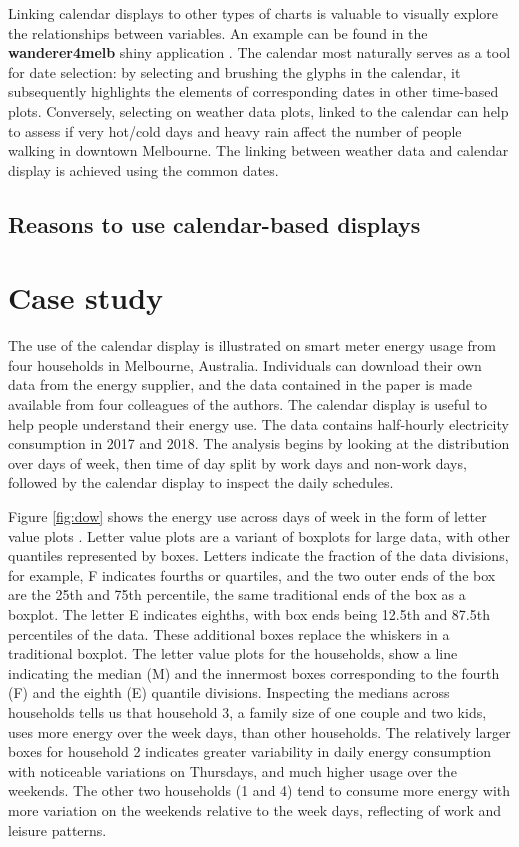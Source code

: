 \documentclass[12pt]{article}
\begin{document}
Linking calendar displays to other types of charts is valuable to visually explore the relationships between variables. An example can be found in the \textbf{wanderer4melb} shiny application \citep{R-wanderer4melb}. The calendar most naturally serves as a tool for date selection: by selecting and brushing the glyphs in the calendar, it subsequently highlights the elements of corresponding dates in other time-based plots. Conversely, selecting on weather data plots, linked to the calendar can help to assess if very hot/cold days and heavy rain affect the number of people walking in downtown Melbourne. The linking between weather data and calendar display is achieved using the common dates.

\hypertarget{reasons-to-use-calendar-based-displays}{%
\subsection{Reasons to use calendar-based displays}\label{reasons-to-use-calendar-based-displays}}

\hypertarget{sec:case}{%
\section{Case study}\label{sec:case}}

The use of the calendar display is illustrated on smart meter energy usage from four households in Melbourne, Australia. Individuals can download their own data from the energy supplier, and the data contained in the paper is made available from four colleagues of the authors. The calendar display is useful to help people understand their energy use. The data contains half-hourly electricity consumption in 2017 and 2018. The analysis begins by looking at the distribution over days of week, then time of day split by work days and non-work days, followed by the calendar display to inspect the daily schedules.

Figure \ref{fig:dow} shows the energy use across days of week in the form of letter value plots \citep{hofmann2017letter}. Letter value plots are a variant of boxplots for large data, with other quantiles represented by boxes. Letters indicate the fraction of the data divisions, for example, F indicates fourths or quartiles, and the two outer ends of the box are the 25th and 75th percentile, the same traditional ends of the box as a boxplot. The letter E indicates eighths, with box ends being 12.5th and 87.5th percentiles of the data. These additional boxes replace the whiskers in a traditional boxplot. The letter value plots for the households, show a line indicating the median (M) and the innermost boxes corresponding to the fourth (F) and the eighth (E) quantile divisions. Inspecting the medians across households tells us that household 3, a family size of one couple and two kids, uses more energy over the week days, than other households. The relatively larger boxes for household 2 indicates greater variability in daily energy consumption with noticeable variations on Thursdays, and much higher usage over the weekends. The other two households (1 and 4) tend to consume more energy with more variation on the weekends relative to the week days, reflecting of work and leisure patterns.
\end{document}
